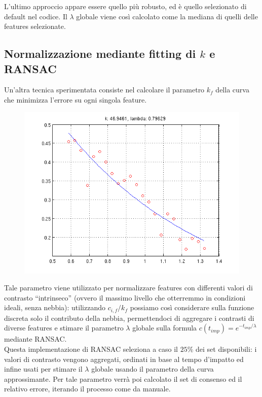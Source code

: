\documentclass[12pt]{report}
\begin{document}
\noindent L'ultimo approccio appare essere quello pi\`u robusto, ed \`e quello selezionato di default nel codice. Il $\lambda$ globale viene cos\`i calcolato come la mediana di quelli delle features selezionate.

\subsection{Normalizzazione mediante fitting di $k$ e RANSAC}

\noindent Un'altra tecnica sperimentata consiste nel calcolare il parametro $k_f$ della curva che minimizza l'errore su ogni singola feature.\\

\begin{figure}[H]
	\centering
	\includegraphics[scale=0.6]{images/fitting.png}
	\label{fig:fitting}
\end{figure}

\noindent Tale parametro viene utilizzato per normalizzare features con differenti valori di contrasto ``intrinseco'' (ovvero il massimo livello che otterremmo in condizioni ideali, senza nebbia): utilizzando $c_{i,f}/k_f$ possiamo cos\`i considerare sulla funzione discreta solo il contributo della nebbia, permettendoci di aggregare i contrasti di diverse features e stimare il parametro $\lambda$ globale sulla formula $ c\left(t_{imp}\right) = e^{-t_{imp}/\lambda} $ mediante RANSAC.\\

\noindent Questa implementazione di RANSAC seleziona a caso il $25\%$ dei set disponibili: i valori di contrasto vengono aggregati, ordinati in base al tempo d'impatto ed infine usati per stimare il $\lambda$ globale usando il parametro della curva approssimante. Per tale parametro verr\`a poi calcolato il set di consenso ed il relativo errore, iterando il processo come da manuale.\\
\end{document}

